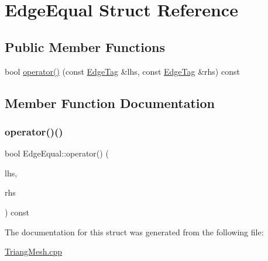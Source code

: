 \hypertarget{structEdgeEqual}{}\section{Edge\+Equal Struct Reference}
\label{structEdgeEqual}
\subsection*{Public Member Functions}
\begin{DoxyCompactItemize}
\item 
bool \hyperlink{structEdgeEqual_a8c064a880ba2bc48b7748e63b3efc297}{operator()} (const \hyperlink{TriangMesh_8h_acc47488d876c8158f668034ca092038b}{Edge\+Tag} \&lhs, const \hyperlink{TriangMesh_8h_acc47488d876c8158f668034ca092038b}{Edge\+Tag} \&rhs) const
\end{DoxyCompactItemize}


\subsection{Member Function Documentation}
\mbox{\label{structEdgeEqual_a8c064a880ba2bc48b7748e63b3efc297}} 
\subsubsection{\texorpdfstring{operator()()}{operator()()}}
{\footnotesize\ttfamily bool Edge\+Equal\+::operator() (\begin{DoxyParamCaption}\item[{const \hyperlink{TriangMesh_8h_acc47488d876c8158f668034ca092038b}{Edge\+Tag} \&}]{lhs,  }\item[{const \hyperlink{TriangMesh_8h_acc47488d876c8158f668034ca092038b}{Edge\+Tag} \&}]{rhs }\end{DoxyParamCaption}) const\hspace{0.3cm}{\ttfamily [inline]}}



The documentation for this struct was generated from the following file\+:\begin{DoxyCompactItemize}
\item 
\hyperlink{TriangMesh_8cpp}{Triang\+Mesh.\+cpp}\end{DoxyCompactItemize}
